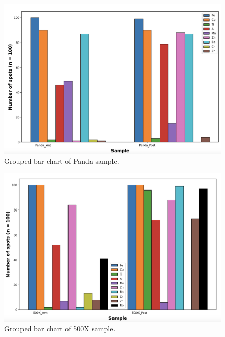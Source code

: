 \begin{figure}[H]
\centering
    \includegraphics[scale=0.27]{images/Panda_HM.png}
    \caption{Grouped bar chart of Panda sample.}
    \label{fig:Panda_HM}
\end{figure} 

\begin{figure}[H]
\centering
    \includegraphics[scale=0.27]{images/500X_HM.png}
    \caption{Grouped bar chart of 500X sample.}
    \label{fig:500X_HM}
\end{figure} 

